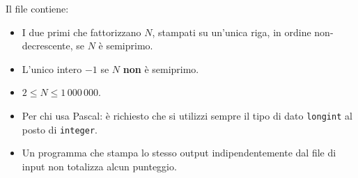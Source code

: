 	\OutputFile
	Il file \outputfile{} contiene:
	\begin{itemize}[nolistsep, itemsep=2mm]
		\item I due primi che fattorizzano $N$, stampati su un'unica riga, in ordine non-decrescente, se $N$ è semiprimo.
		\item L'unico intero $-1$ se $N$ \textbf{non} è semiprimo.
	\end{itemize}
	


\Constraints

\begin{itemize}[nolistsep, itemsep=2mm]
	\item $2 \le N \le 1\,000\,000$.
\end{itemize}


\Examples

\begin{example}
%
%
%
\end{example}

\Notes
\begin{itemize}[nolistsep, itemsep=2mm]
	\item Per chi usa Pascal: è richiesto che si utilizzi sempre il tipo di dato \verb|longint| al posto di \verb|integer|.
	\item Un programma che stampa lo stesso output indipendentemente dal file di input non totalizza alcun punteggio.
\end{itemize}


\newpage
\begin{solution}
    
\end{solution}
